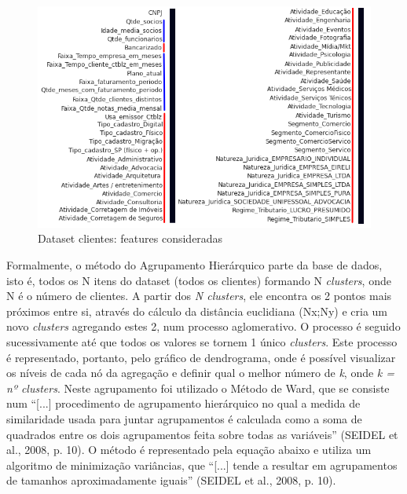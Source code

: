 \documentclass[twocolumn]{rbef}
\newcommand{\1}{\mathbbm{1}}
\begin{document}
\begin{figure}[!htb]
  \includegraphics[scale=0.5]{1. Dataset clientes - variaveis.png}
  \caption{Dataset clientes: features consideradas}
  \label{fig1}
\end{figure}
\newline\linebreak Formalmente, o método do Agrupamento Hierárquico parte da base de dados, isto é, todos os N itens do dataset (todos os clientes) formando N \emph{clusters}, onde N é o número de clientes. A partir dos \emph{N clusters}, ele encontra os 2 pontos mais próximos entre si, através do cálculo da distância euclidiana (Nx;Ny) e cria um novo \emph{clusters} agregando estes 2, num processo aglomerativo. O processo é seguido sucessivamente até que todos os valores se tornem 1 único \emph{clusters}. Este processo é representado, portanto, pelo gráfico de dendrograma, onde é possível visualizar os níveis de cada nó da agregação e definir qual o melhor número de \emph{k}, onde \emph{k = nº clusters}. 
Neste agrupamento foi utilizado o Método de Ward, que se consiste num “[...] procedimento de agrupamento hierárquico no qual a medida de similaridade usada para juntar agrupamentos é calculada como a soma de quadrados entre os dois agrupamentos feita sobre todas as variáveis” (SEIDEL et al., 2008, p. 10)\cite{SEIDEL}. O método é representado pela equação abaixo e utiliza um algoritmo de minimização variâncias, que “[...] tende a resultar em agrupamentos de tamanhos aproximadamente iguais” (SEIDEL et al., 2008, p. 10)\cite{SEIDEL}.
\end{document}
